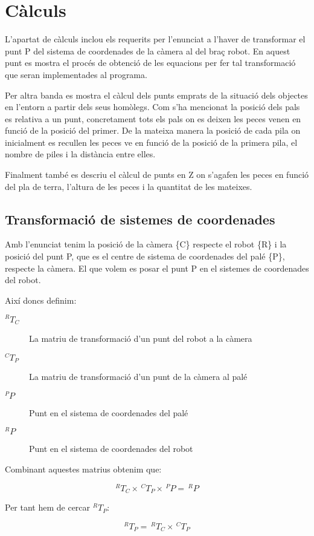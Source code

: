 \section{Càlculs}
L'apartat de càlculs inclou els requerits per l'enunciat a
l'haver de transformar el punt P del sistema de coordenades de la càmera al del
braç robot. En aquest punt es mostra el procés de obtenció de les equacions per
fer tal transformació que seran implementades al programa.

Per altra banda es mostra el càlcul dels punts emprats de la situació dels
objectes en l'entorn a partir dels seus homòlegs. Com s'ha mencionat la posició
dels pals es relativa a un punt, concretament tots els pals on es deixen les
peces venen en funció de la posició del primer.
De la mateixa manera la posició de cada pila on inicialment es recullen les
peces ve en funció de la posició de la primera pila, el nombre de piles i la
distància entre elles.

Finalment també es descriu el càlcul de punts en Z on s'agafen les peces en
funció del pla de terra, l'altura de les peces i la quantitat de les mateixes.

\subsection{Transformació de sistemes de coordenades}
Amb l'enunciat tenim la posició de la càmera \{C\} respecte el robot \{R\} i
la posició del punt P, que es el centre de sistema de coordenades del palé
\{P\}, respecte la càmera. El que volem es posar el punt P en el sistemes de
coordenades del robot.

Així doncs definim:

\begin{description}
\item[$^RT_C$] La matriu de transformació d'un punt del robot a la càmera
\item[$^CT_P$] La matriu de transformació d'un punt de la càmera al palé
\item[$^PP$] Punt en el sistema de coordenades del palé
\item[$^RP$] Punt en el sistema de coordenades del robot
\end{description}

Combinant aquestes matrius obtenim que:

$$ ^RT_C \times \,^CT_P \times \,^PP = \,^RP $$

Per tant hem de cercar $^RT_P$:

$$ ^RT_P = \,^RT_C \times \,^CT_P $$

